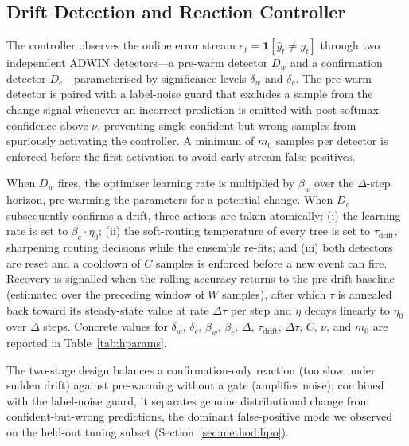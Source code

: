 \documentclass[sigconf,anonymous,review]{acmart}
\begin{document}
\subsection{Drift Detection and Reaction Controller}
\label{sec:method:drift}
The controller observes the online error stream $e_t = \mathbf{1}[\hat{y}_t \neq y_t]$ through two independent ADWIN detectors—a pre-warm detector $D_w$ and a
confirmation detector $D_c$—parameterised by significance levels $\delta_w$ and $\delta_c$. The pre-warm detector is paired with a label-noise guard that excludes a
sample from the change signal whenever an incorrect prediction is emitted with post-softmax confidence above $\nu$, preventing single confident-but-wrong samples from
spuriously activating the controller. A minimum of $m_0$ samples per detector is enforced before the first activation to avoid early-stream false positives.

When $D_w$ fires, the optimiser learning rate is multiplied by $\beta_w$ over the $\Delta$-step horizon, pre-warming the parameters for a potential change. When $D_c$
subsequently confirms a drift, three actions are taken atomically: (i) the learning rate is set to $\beta_c \cdot \eta_0$; (ii) the soft-routing temperature of every tree
is set to $\tau_{\mathrm{drift}}$, sharpening routing decisions while the ensemble re-fits; and (iii) both detectors are reset and a cooldown of $C$ samples is enforced
before a new event can fire. Recovery is signalled when the rolling accuracy returns to the pre-drift baseline (estimated over the preceding window of $W$ samples),
after which $\tau$ is annealed back toward its steady-state value at rate $\Delta\tau$ per step and $\eta$ decays linearly to $\eta_0$ over $\Delta$ steps. Concrete values
for $\delta_w$, $\delta_c$, $\beta_w$, $\beta_c$, $\Delta$, $\tau_{\mathrm{drift}}$, $\Delta\tau$, $C$, $\nu$, and $m_0$ are reported in Table~\ref{tab:hparams}.

The two-stage design balances a confirmation-only reaction (too slow under sudden drift) against pre-warming without a gate (amplifies noise); combined with the
label-noise guard, it separates genuine distributional change from confident-but-wrong predictions, the dominant false-positive mode we observed on the held-out tuning
subset (Section~\ref{sec:method:hpo}).
\end{document}

